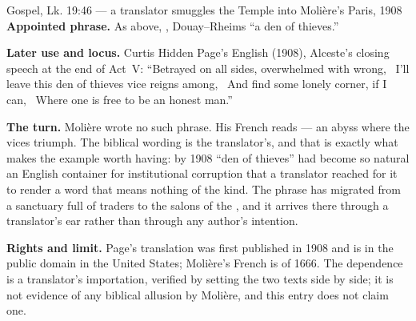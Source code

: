\begin{afterlife}{Gospel, Lk. 19:46 --- a translator smuggles the Temple into Molière's Paris, 1908}
\textbf{Appointed phrase.} As above, , Douay--Rheims
``a den of thieves.''

\textbf{Later use and locus.} Curtis Hidden Page's English 
(1908), Alceste's closing speech at the end of Act~V: ``Betrayed on all sides,
overwhelmed with wrong, \textbar\ I'll leave this den of thieves vice reigns
among, \textbar\ And find some lonely corner, if I can, \textbar\ Where one is
free to be an honest man.''

\textbf{The turn.} Molière wrote no such phrase. His French reads
 --- an abyss where the vices triumph.
The biblical wording is the translator's, and that is exactly what makes the
example worth having: by 1908 ``den of thieves'' had become so natural an
English container for institutional corruption that a translator reached for
it to render a word that means nothing of the kind. The phrase has migrated
from a sanctuary full of traders to the salons of the ,
and it arrives there through a translator's ear rather than through any
author's intention.

\textbf{Rights and limit.} Page's translation was first published in 1908 and
is in the public domain in the United States; Molière's French is of 1666. The
dependence is a translator's importation, verified by setting the two texts
side by side; it is not evidence of any biblical allusion by Molière, and this
entry does not claim one.
\end{afterlife}
